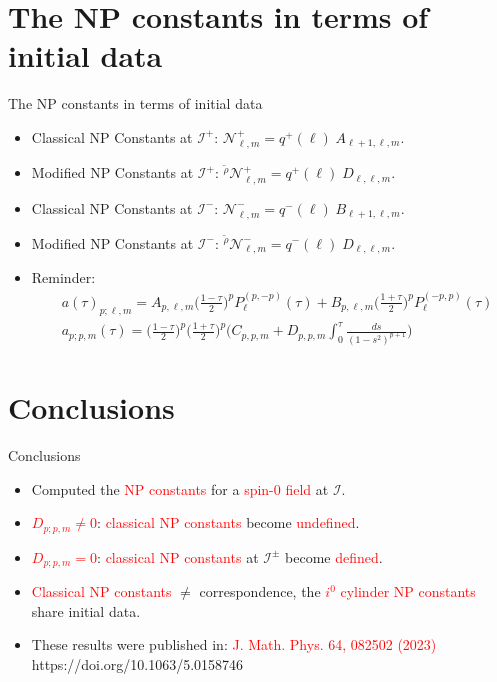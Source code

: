 \documentclass{beamer}
\theoremstyle{remark}
\theoremstyle{plain}
\theoremstyle{plain}
\begin{document}
\section{The NP constants in terms of initial data}
\begin{frame}{The NP constants in terms of initial data}
  \begin{itemize}
    \item Classical NP Constants at $\mathscr{I}^{+}$: $\mathcal{N}^{+}_{\ell,m} = q^{+}(\ell) \;A_{\ell+1,\ell,m}$.
    \item Modified NP Constants at $\mathscr{I}^{+}$: ${}^{\tilde{\rho}}\mathcal{N}^{+}_{\ell,m} = q^{+}(\ell) \;D_{\ell,\ell,m}$.
    \item Classical NP Constants at $\mathscr{I}^{-}$: $\mathcal{N}^{-}_{\ell,m} = q^{-}(\ell) \; B_{\ell+1,\ell,m}$.
    \item Modified NP Constants at $\mathscr{I}^{-}$: ${}^{\tilde{\rho}}\mathcal{N}^{-}_{\ell,m} = q^{-}(\ell) \;D_{\ell,\ell,m}$.
    \vspace{5mm}
    \item Reminder:
    \begin{align}
      & a(\tau)_{p;\ell,m} =A_{p,\ell,m}\bigg(\frac{1-\tau}{2}\bigg)^{p}P_{\ell}^{(p,-p)}(\tau) + B_{p,\ell,m}\bigg(\frac{1+\tau}{2}\bigg)^{p}P_{\ell}^{(-p,p)}(\tau) \nonumber \\
      & {a}_{p;p,m}(\tau) =\bigg(\frac{1-\tau}{2}\bigg)^{p}\bigg(\frac{1+\tau}{2}\bigg)^{p}\Bigg(C_{p,p,m}+D_{p,p,m}\int_{0}^{\tau} \frac{ds}{(1-s^2)^{p+1}}\Bigg) \nonumber
    \end{align}
  \end{itemize}
\end{frame}
\section{Conclusions}
\begin{frame}{Conclusions}
  \begin{itemize}
    \item Computed the \textcolor{red}{NP constants} for a \textcolor{red}{spin-0 field} at $\mathscr{I}$.
    \vspace{5mm}
    \item \textcolor{red}{\(D_{p;p,m} \neq 0\)}: \textcolor{red}{classical NP constants} become \textcolor{red}{undefined}.
    \vspace{5mm}
    \item \textcolor{red}{\(D_{p;p,m} = 0\)}: \textcolor{red}{classical NP constants} at \(\mathscr{I}^{\pm}\) become \textcolor{red}{defined}.
    \vspace{5mm}
    \item \textcolor{red}{Classical NP constants} $\neq$ correspondence, the \textcolor{red}{\(i^0\) cylinder NP constants} share initial data.
    \vspace{5mm}
    \item These results were published in: \textcolor{red}{J. Math. Phys. 64, 082502 (2023)} https://doi.org/10.1063/5.0158746
  \end{itemize}
\end{frame}
\end{document}
